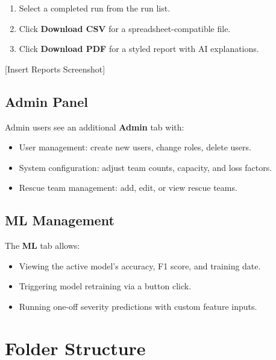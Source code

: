 \begin{enumerate}[leftmargin=*]
    \item Select a completed run from the run list.
    \item Click \textbf{Download CSV} for a spreadsheet-compatible file.
    \item Click \textbf{Download PDF} for a styled report with AI explanations.
\end{enumerate}

[Insert Reports Screenshot]

\subsection{Admin Panel}

Admin users see an additional \textbf{Admin} tab with:
\begin{itemize}[leftmargin=*]
    \item User management: create new users, change roles, delete users.
    \item System configuration: adjust team counts, capacity, and loss factors.
    \item Rescue team management: add, edit, or view rescue teams.
\end{itemize}

\subsection{ML Management}

The \textbf{ML} tab allows:
\begin{itemize}[leftmargin=*]
    \item Viewing the active model's accuracy, F1 score, and training date.
    \item Triggering model retraining via a button click.
    \item Running one-off severity predictions with custom feature inputs.
\end{itemize}

\section{Folder Structure}
\label{sec:appendix_folder}

